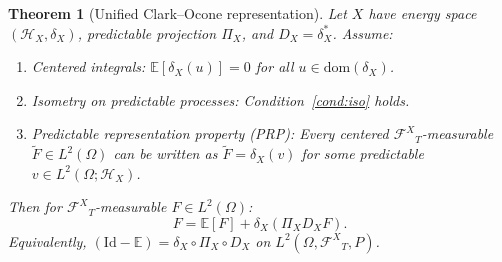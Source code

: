 \documentclass[11pt,a4paper]{article}
\theoremstyle{plain}
\newtheorem{theorem}{Theorem}[section]
\theoremstyle{definition}
\theoremstyle{remark}
\newcommand{\E}{\mathbb{E}}
\newcommand{\Id}{\mathrm{Id}}
\newcommand{\dom}{\mathrm{dom}}
\newcommand{\HX}{\mathcal{H}_X}
\newcommand{\FX}{\mathcal{F}^X}
\begin{document}
\begin{theorem}[Unified Clark--Ocone representation]\label{thm:CO}
Let $X$ have energy space $(\HX, \delta_X)$, predictable projection $\Pi_X$, and $D_X = \delta_X^*$. Assume:
\begin{enumerate}[label=\textup{(\roman*)}]
\item \textup{Centered integrals:} $\E[\delta_X(u)] = 0$ for all $u \in \dom(\delta_X)$.
\item \textup{Isometry on predictable processes:} Condition~\ref{cond:iso} holds.
\item \textup{Predictable representation property (PRP):} Every centered ${\FX}_T$-measurable $\tilde{F} \in L^2(\Omega)$ can be written as $\tilde{F} = \delta_X(v)$ for some predictable $v \in L^2(\Omega; \HX)$.
\end{enumerate}
Then for ${\FX}_T$-measurable $F \in L^2(\Omega)$:
\begin{equation}\label{eq:clark_ocone}
F = \E[F] + \delta_X(\Pi_X D_X F).
\end{equation}
Equivalently, $(\Id - \E) = \delta_X \circ \Pi_X \circ D_X$ on $L^2(\Omega, {\FX}_T, P)$.
\end{theorem}
\end{document}
